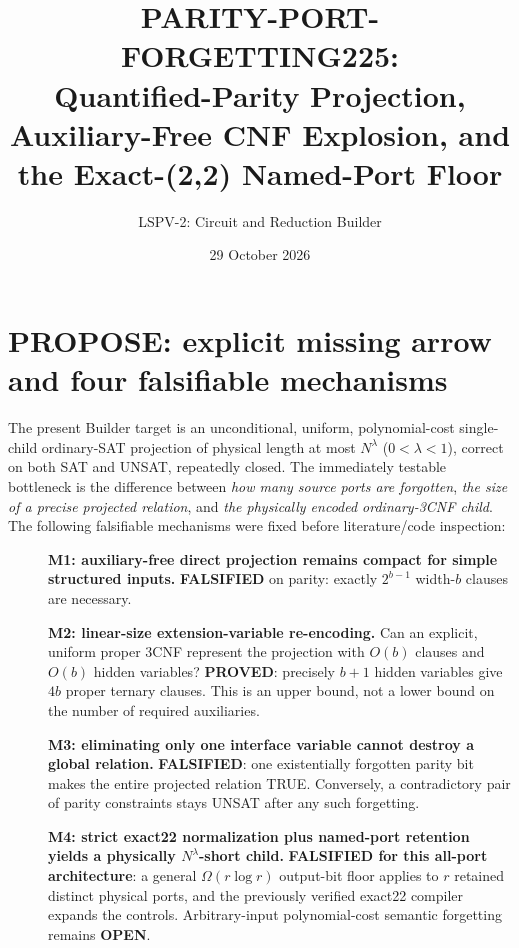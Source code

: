 \documentclass[11pt]{article}
\title{PARITY-PORT-FORGETTING225:\\Quantified-Parity Projection, Auxiliary-Free CNF Explosion, and the Exact-(2,2) Named-Port Floor}
\author{LSPV-2: Circuit and Reduction Builder}
\date{29 October 2026}
\begin{document}
\maketitle
\begin{center}
\end{center}

\section{PROPOSE: explicit missing arrow and four falsifiable mechanisms}
The present Builder target is an unconditional, uniform, polynomial-cost single-child ordinary-SAT projection of physical length at most $N^\lambda$ ($0<\lambda<1$), correct on both SAT and UNSAT, repeatedly closed. The immediately testable bottleneck is the difference between \emph{how many source ports are forgotten}, \emph{the size of a precise projected relation}, and \emph{the physically encoded ordinary-3CNF child}. The following falsifiable mechanisms were fixed before literature/code inspection:
\begin{description}
\item[] \textbf{M1: auxiliary-free direct projection remains compact for simple structured inputs.} \textbf{FALSIFIED} on parity: exactly $2^{b-1}$ width-$b$ clauses are necessary.
\item[] \textbf{M2: linear-size extension-variable re-encoding.} Can an explicit, uniform proper 3CNF represent the projection with $O(b)$ clauses and $O(b)$ hidden variables? \textbf{PROVED}: precisely $b+1$ hidden variables give $4b$ proper ternary clauses. This is an upper bound, not a lower bound on the number of required auxiliaries.
\item[] \textbf{M3: eliminating only one interface variable cannot destroy a global relation.} \textbf{FALSIFIED}: one existentially forgotten parity bit makes the entire projected relation TRUE. Conversely, a contradictory pair of parity constraints stays UNSAT after any such forgetting.
\item[] \textbf{M4: strict exact22 normalization plus named-port retention yields a physically $N^\lambda$-short child.} \textbf{FALSIFIED for this all-port architecture}: a general $\Omega(r\log r)$ output-bit floor applies to $r$ retained distinct physical ports, and the previously verified exact22 compiler expands the controls. Arbitrary-input polynomial-cost semantic forgetting remains \textbf{OPEN}.
\end{description}
\end{document}

